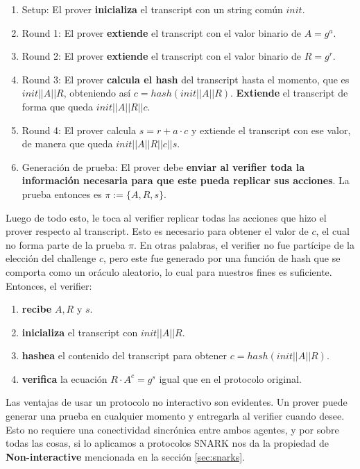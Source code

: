 \begin{enumerate}
    \item Setup: El prover \textbf{inicializa} el transcript con un string común $init$.
    \item Round 1: El prover \textbf{extiende} el transcript con el valor binario de $A=g^a$.
    \item Round 2: El prover \textbf{extiende} el transcript con el valor binario de $R = g^r$.
    \item Round 3: El prover \textbf{calcula el hash} del transcript hasta el momento, que es $init || A || R$, obteniendo así $c = hash(init||A||R)$. \textbf{Extiende} el transcript de forma que queda $init || A || R || c$.
    \item Round 4: El prover calcula $s = r + a\cdot c$ y extiende el transcript con ese valor, de manera que queda $init||A||R||c||s$. 
    \item Generación de prueba: El prover debe \textbf{enviar al verifier toda la información necesaria para que este pueda replicar sus acciones}. La prueba entonces es  $\pi := \{A, R, s\}$.
\end{enumerate}

Luego de todo esto, le toca al verifier replicar todas las acciones que hizo el prover respecto al transcript. Esto es necesario para obtener el valor de $c$, el cual no forma parte de la prueba $\pi$. En otras palabras, el verifier no fue partícipe de la elección del challenge $c$, pero este fue generado por una función de hash que se comporta como un oráculo aleatorio, lo cual para nuestros fines es suficiente. Entonces, el verifier:

\begin{enumerate}
    \item \textbf{recibe} $A,R$ y $s$.
    \item \textbf{inicializa} el transcript con $init||A||R$.
    \item \textbf{hashea} el contenido del transcript para obtener $c = hash(init||A||R)$.
    \item \textbf{verifica} la ecuación $R \cdot A^c = g^s$ igual que en el protocolo original.
\end{enumerate}

Las ventajas de usar un protocolo no interactivo son evidentes. Un prover puede generar una prueba en cualquier momento y entregarla al verifier cuando desee. Esto no requiere una conectividad sincrónica entre ambos agentes, y por sobre todas las cosas, si lo aplicamos a protocolos SNARK nos da la propiedad de \textbf{Non-interactive} mencionada en la sección \ref{sec:snarks}.

